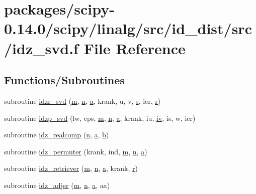 \hypertarget{idz__svd_8f}{}\section{packages/scipy-\/0.14.0/scipy/linalg/src/id\+\_\+dist/src/idz\+\_\+svd.f File Reference}
\label{idz__svd_8f}
\subsection*{Functions/\+Subroutines}
\begin{DoxyCompactItemize}
\item 
subroutine \hyperlink{idz__svd_8f_ad1d3d326958663a4688650d36c8ba76a}{idzr\+\_\+svd} (\hyperlink{indexexpr_8h_ab72fdb4031d47b75ab26dd18a437bcdc}{m}, \hyperlink{indexexpr_8h_ab427e2e2b4d6cec55fa088ea2a692ace}{n}, \hyperlink{gen__mat5files_8m_aae328bf20413f220e38aec4d95bfd6da}{a}, krank, u, v, \hyperlink{indexexpr_8h_ae024b0db549122b44c349ae28ec990dc}{s}, ier, \hyperlink{indexexpr_8h_ac434fd11cc2493608d8d91424d60c17e}{r})
\item 
subroutine \hyperlink{idz__svd_8f_a17ba6b3eb2d7a8fa6cee29ca2f518fe8}{idzp\+\_\+svd} (lw, eps, \hyperlink{indexexpr_8h_ab72fdb4031d47b75ab26dd18a437bcdc}{m}, \hyperlink{indexexpr_8h_ab427e2e2b4d6cec55fa088ea2a692ace}{n}, \hyperlink{gen__mat5files_8m_aae328bf20413f220e38aec4d95bfd6da}{a}, krank, iu, \hyperlink{cephes_8h_ad4b28607832b258aa453374d01dfe8c5}{iv}, is, w, ier)
\item 
subroutine \hyperlink{idz__svd_8f_aa2518a91638392027b0718c541e5965d}{idz\+\_\+realcomp} (\hyperlink{indexexpr_8h_ab427e2e2b4d6cec55fa088ea2a692ace}{n}, \hyperlink{gen__mat5files_8m_aae328bf20413f220e38aec4d95bfd6da}{a}, \hyperlink{gen__mat5files_8m_a7b38767b3b6a8dae167e5afa4fc340b0}{b})
\item 
subroutine \hyperlink{idz__svd_8f_a9920aa71c84073a8ee43a844b73288e6}{idz\+\_\+permuter} (krank, ind, \hyperlink{indexexpr_8h_ab72fdb4031d47b75ab26dd18a437bcdc}{m}, \hyperlink{indexexpr_8h_ab427e2e2b4d6cec55fa088ea2a692ace}{n}, \hyperlink{gen__mat5files_8m_aae328bf20413f220e38aec4d95bfd6da}{a})
\item 
subroutine \hyperlink{idz__svd_8f_af80e0e69fed54ce86010d7e0444918d8}{idz\+\_\+retriever} (\hyperlink{indexexpr_8h_ab72fdb4031d47b75ab26dd18a437bcdc}{m}, \hyperlink{indexexpr_8h_ab427e2e2b4d6cec55fa088ea2a692ace}{n}, \hyperlink{gen__mat5files_8m_aae328bf20413f220e38aec4d95bfd6da}{a}, krank, \hyperlink{indexexpr_8h_ac434fd11cc2493608d8d91424d60c17e}{r})
\item 
subroutine \hyperlink{idz__svd_8f_a9488258c2735d7f0a39d73b0cf98533e}{idz\+\_\+adjer} (\hyperlink{indexexpr_8h_ab72fdb4031d47b75ab26dd18a437bcdc}{m}, \hyperlink{indexexpr_8h_ab427e2e2b4d6cec55fa088ea2a692ace}{n}, \hyperlink{gen__mat5files_8m_aae328bf20413f220e38aec4d95bfd6da}{a}, aa)
\end{DoxyCompactItemize}


